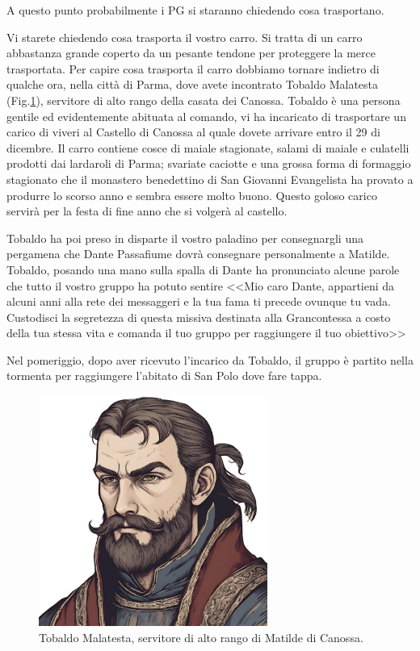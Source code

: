 \documentclass[letterpaper,twocolumn,openany,nodeprecatedcode]{dndbook}
\begin{document}
A questo punto probabilmente i PG si staranno chiedendo cosa trasportano.

\begin{DndReadAloud}
Vi starete chiedendo cosa trasporta il vostro carro. Si tratta di un carro abbastanza grande coperto da un pesante tendone per proteggere la merce trasportata. Per capire cosa trasporta il carro dobbiamo tornare indietro di qualche ora, nella città di Parma, dove avete incontrato Tobaldo Malatesta (Fig.\ref{fig:tobaldo}), servitore di alto rango della casata dei Canossa. Tobaldo è una persona gentile ed evidentemente abituata al comando, vi ha incaricato di trasportare un carico di viveri al Castello di Canossa al quale dovete arrivare entro il 29 di dicembre. Il carro contiene cosce di maiale stagionate, salami di maiale e culatelli prodotti dai lardaroli di Parma; svariate caciotte e una grossa forma di formaggio stagionato che il monastero benedettino di San Giovanni Evangelista ha provato a produrre lo scorso anno e sembra essere molto buono. Questo goloso carico servirà per la festa di fine anno che si volgerà al castello.

Tobaldo ha poi preso in disparte il vostro paladino per consegnargli una pergamena che Dante Passafiume dovrà consegnare personalmente a Matilde. Tobaldo, posando una mano sulla spalla di Dante ha pronunciato alcune parole che tutto il vostro gruppo ha potuto sentire <<Mio caro Dante, appartieni da alcuni anni alla rete dei messaggeri e la tua fama ti precede ovunque tu vada. Custodisci la segretezza di questa missiva destinata alla Grancontessa a costo della tua stessa vita e comanda il tuo gruppo per raggiungere il tuo obiettivo>>
\end{DndReadAloud}

Nel pomeriggio, dopo aver ricevuto l'incarico da Tobaldo, il gruppo è partito nella tormenta per raggiungere l'abitato di San Polo dove fare tappa.

\begin{figure}
\centering
\includegraphics[width=7.5cm]{img/tobaldo-malatesta.png}
    \caption{\textsf{Tobaldo Malatesta, servitore di alto rango di Matilde di Canossa.\cite{url:ai}}}
    \label{fig:tobaldo}
\end{figure}
\end{document}
